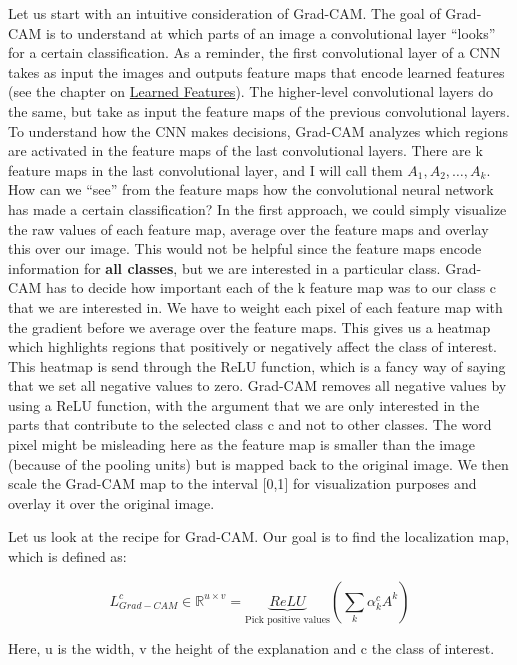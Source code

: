 \documentclass[
  11pt,
]{scrbook}
\begin{document}
Let us start with an intuitive consideration of Grad-CAM.
The goal of Grad-CAM is to understand at which parts of an image a convolutional layer ``looks'' for a certain classification.
As a reminder, the first convolutional layer of a CNN takes as input the images and outputs feature maps that encode learned features (see the chapter on \protect\hyperlink{cnn-features}{Learned Features}).
The higher-level convolutional layers do the same, but take as input the feature maps of the previous convolutional layers.
To understand how the CNN makes decisions, Grad-CAM analyzes which regions are activated in the feature maps of the last convolutional layers.
There are k feature maps in the last convolutional layer, and I will call them \(A_1, A_2, \ldots, A_k\).
How can we ``see'' from the feature maps how the convolutional neural network has made a certain classification?
In the first approach, we could simply visualize the raw values of each feature map, average over the feature maps and overlay this over our image.
This would not be helpful since the feature maps encode information for \textbf{all classes}, but we are interested in a particular class.
Grad-CAM has to decide how important each of the k feature map was to our class c that we are interested in.
We have to weight each pixel of each feature map with the gradient before we average over the feature maps.
This gives us a heatmap which highlights regions that positively or negatively affect the class of interest.
This heatmap is send through the ReLU function, which is a fancy way of saying that we set all negative values to zero.
Grad-CAM removes all negative values by using a ReLU function, with the argument that we are only interested in the parts that contribute to the selected class c and not to other classes.
The word pixel might be misleading here as the feature map is smaller than the image (because of the pooling units) but is mapped back to the original image.
We then scale the Grad-CAM map to the interval {[}0,1{]} for visualization purposes and overlay it over the original image.

Let us look at the recipe for Grad-CAM.
Our goal is to find the localization map, which is defined as:

\[L^c_{Grad-CAM} \in \mathbb{R}^{u\times v} = \underbrace{ReLU}_{\text{Pick positive values}}\left(\sum_{k} \alpha_k^c A^k\right)\]

Here, u is the width, v the height of the explanation and c the class of interest.
\end{document}
